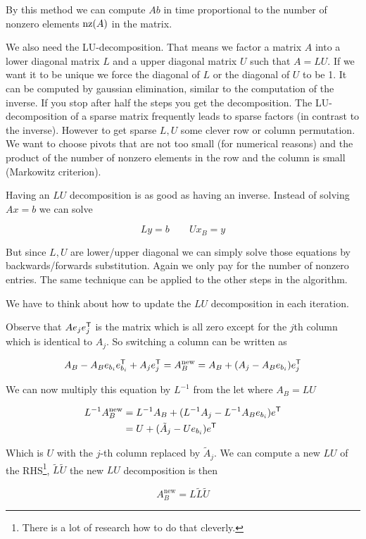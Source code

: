 By this method we can compute $Ab$ in time proportional to the number of nonzero elements $\text{nz}(A)$ in the matrix.

We also need the LU-decomposition. That means we factor a matrix $A$ into a lower diagonal matrix $L$ and a upper diagonal matrix $U$ such that $A=LU$. If we want it to be unique we force the diagonal of $L$ or the diagonal of $U$ to be 1. It can be computed by gaussian elimination, similar to the computation of the inverse. If you stop after half the steps you get the decomposition. The LU-decomposition of a sparse matrix frequently leads to sparse factors (in contrast to the inverse). However to get sparse $L,U$ some clever row or column permutation. We want to choose pivots that are not too small (for numerical reasons) and the product of the number of nonzero elements in the row and the column is small (Markowitz criterion).

Having an $LU$ decomposition is as good as having an inverse. Instead of solving $Ax=b$ we can solve

\[Ly=b\qquad Ux_B=y\]

But since $L,U$ are lower/upper diagonal we can simply solve those equations by backwards/forwards substitution. Again we only pay for the number of nonzero entries. The same technique can be applied to the other steps in the algorithm.

We have to think about how to update the $LU$ decomposition in each iteration.

Observe that $Ae_j{e}^\text{\upshape \sffamily T}_j$ is the matrix which is all zero except for the $j$th column which is identical to $A_j$. So switching a column can be written as

\[A_B-A_Be_{b_i}{e}^\text{\upshape \sffamily T}_{b_i} + A_j{e}^\text{\upshape \sffamily T}_j =A_B^{\text{new}} = A_B+(A_j-A_Be_{b_i}){e}^\text{\upshape \sffamily T}_j\]

We can now multiply this equation by $L^{-1}$ from the let where $A_B=LU$

\begin{align*}
L^{-1}A_B^{\text{new}} &= L^{-1}A_B+(L^{-1}A_j - L^{-1}A_Be_{b_i}){e}^\text{\upshape \sffamily T}\\
&= U+(\tilde A_j - Ue_{b_i}){e}^\text{\upshape \sffamily T}
\end{align*}

Which is $U$ with the $j$-th column replaced by $\tilde A_j$. We can compute a new $LU$ of the RHS\footnote{There is a lot of research how to do that cleverly.}, $\tilde L \tilde U$ the new $LU$ decomposition is then

\[A_B^{\text{new}} = L\tilde L \tilde U\]

